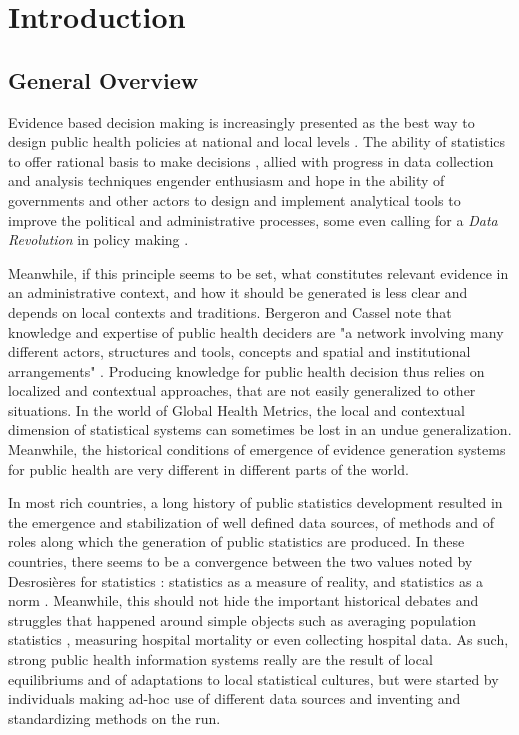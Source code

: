 \section{Introduction}

\subsection{General Overview}

Evidence based decision making is increasingly presented as the best way to design public health policies at national and local levels \cite{abou-zahr_health_2005,shibuya_health_2005,bambas_nolen_strengthening_2005,mutemwa_hmis_2006,boerma_public_2013}.
The ability of statistics to offer rational basis to make decisions \cite{porter_trust_1996,desrosieres_politique_1993},
allied with progress in data collection and analysis techniques engender enthusiasm and hope in the ability of governments and other actors to design and implement analytical tools to improve the political and administrative processes, some even calling for a \textit{Data Revolution} in policy making \cite{independent_expert_group_on_a_data_revolution_for_sustainable_development_world_2014,center_for_global_development_delivering_2014}.

Meanwhile, if this principle seems to be set, what constitutes relevant evidence in an administrative context, and how it should be generated is less clear and depends on local contexts and traditions. Bergeron and Cassel note that knowledge and expertise of public health deciders are "a network involving many different actors, structures and tools, concepts and spatial and institutional arrangements" \cite{bergeron_savoirs_2014}. Producing knowledge for public health decision thus relies on localized and contextual approaches, that are not easily generalized to other situations. In the world of Global Health Metrics, the local and contextual dimension of statistical systems can sometimes be lost in an undue generalization. Meanwhile, the historical conditions of emergence of evidence generation systems for public health are very different in different parts of the world.

In most rich countries, a long history of public statistics development resulted in the emergence and stabilization of well defined data sources, of methods and of roles along which the generation of public statistics are produced. In these countries, there seems to be a convergence between the two values noted by Desrosières for statistics : statistics as a measure of reality, and statistics as a norm \cite{desrosieres_prouver_2014,desrosieres_administrator_1997}. Meanwhile, this should not hide the important historical debates and struggles that happened around simple objects such as averaging population statistics \cite{desrosieres_politique_1993,porter_trust_1996}, measuring hospital mortality or even collecting hospital data. As such, strong public health information systems really are the result of local equilibriums and of adaptations to local statistical cultures, but were started by individuals making ad-hoc use of different data sources and inventing and standardizing methods on the run\cite{lecuyer_medecins_1987}.

